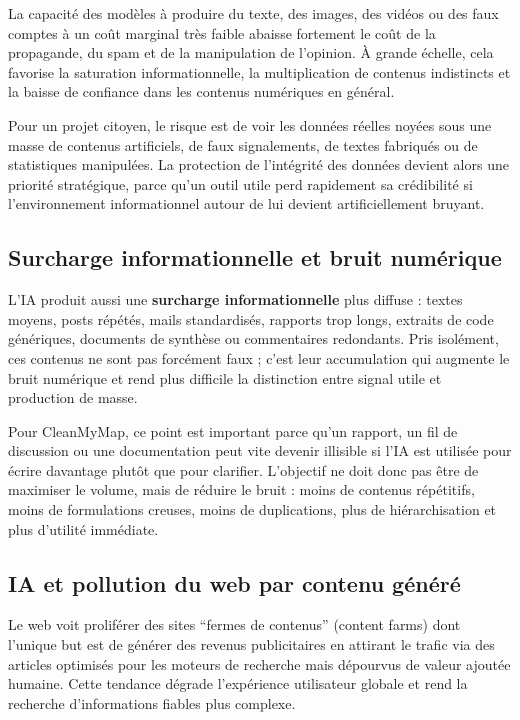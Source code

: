 \documentclass[
  10pt,
  a4paper,
  DIV=11,
  numbers=noendperiod,
  oneside]{scrreprt}
\let\oldtextbf\textbf
\renewcommand{\textbf}[1]{\oldtextbf{\textcolor{cmmnavy}{#1}}}
\begin{document}
La capacité des modèles à produire du texte, des images, des vidéos ou
des faux comptes à un coût marginal très faible abaisse fortement le
coût de la propagande, du spam et de la manipulation de l'opinion. À
grande échelle, cela favorise la saturation informationnelle, la
multiplication de contenus indistincts et la baisse de confiance dans
les contenus numériques en général.

Pour un projet citoyen, le risque est de voir les données réelles noyées
sous une masse de contenus artificiels, de faux signalements, de textes
fabriqués ou de statistiques manipulées. La protection de l'intégrité
des données devient alors une priorité stratégique, parce qu'un outil
utile perd rapidement sa crédibilité si l'environnement informationnel
autour de lui devient artificiellement bruyant.

\subsection{Surcharge informationnelle et bruit
numérique}\label{surcharge-informationnelle-et-bruit-numuxe9rique}

L'IA produit aussi une \textbf{surcharge informationnelle} plus diffuse
: textes moyens, posts répétés, mails standardisés, rapports trop longs,
extraits de code génériques, documents de synthèse ou commentaires
redondants. Pris isolément, ces contenus ne sont pas forcément faux ;
c'est leur accumulation qui augmente le bruit numérique et rend plus
difficile la distinction entre signal utile et production de masse.

Pour CleanMyMap, ce point est important parce qu'un rapport, un fil de
discussion ou une documentation peut vite devenir illisible si l'IA est
utilisée pour écrire davantage plutôt que pour clarifier. L'objectif ne
doit donc pas être de maximiser le volume, mais de réduire le bruit :
moins de contenus répétitifs, moins de formulations creuses, moins de
duplications, plus de hiérarchisation et plus d'utilité immédiate.

\subsection{IA et pollution du web par contenu
généré}\label{ia-et-pollution-du-web-par-contenu-guxe9nuxe9ruxe9}

Le web voit proliférer des sites ``fermes de contenus'' (content farms)
dont l'unique but est de générer des revenus publicitaires en attirant
le trafic via des articles optimisés pour les moteurs de recherche mais
dépourvus de valeur ajoutée humaine. Cette tendance dégrade l'expérience
utilisateur globale et rend la recherche d'informations fiables plus
complexe.
\end{document}
